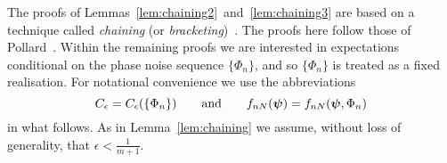 \documentclass[aap]{imsart}
\begin{document}
The proofs of Lemmas~\ref{lem:chaining2}~and~\ref{lem:chaining3} are based on a technique called \emph{chaining} (or \emph{bracketing})~\cite{Dudley_unif_central_lim_th_1999,Ossiander_clt_bracketing_1984,Pollard_asymp_empi_proc_1989,Pollard_new_ways_clts_1986}.  The proofs here follow those of Pollard~\cite[Section 3]{Pollard_asymp_empi_proc_1989}.  Within the remaining proofs we are interested in expectations conditional on the phase noise sequence $\{\Phi_n\}$, and so $\{\Phi_n\}$ is treated as a fixed realisation.  For notational convenience we use the abbreviations 
\[
C_\epsilon = C_\epsilon(\{\Phi_n\}) \qquad \text{and} \qquad f_{nN}(\boldsymbol{\psi}) = f_{nN}(\boldsymbol{\psi}, \Phi_n)
\]
in what follows.  As in Lemma~\ref{lem:chaining} we assume, without loss of generality, that $\epsilon < \tfrac{1}{m+1}$.  %
\end{document}
